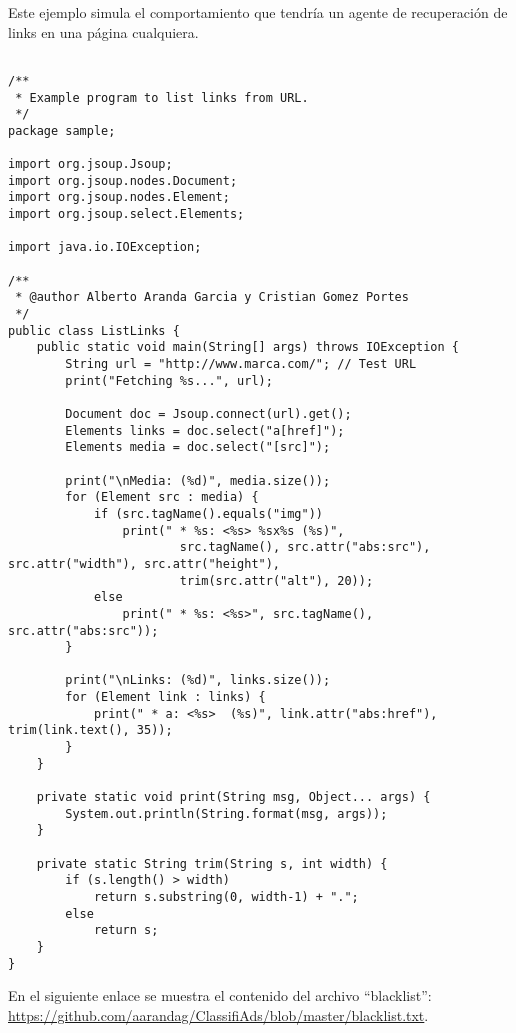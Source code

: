 \documentclass{pre-tfg}
\begin{document}
Este ejemplo simula el comportamiento que tendría un agente de recuperación de links en una página cualquiera.

\begin{lstlisting}[caption=Ejemplo de código de recuperación de links de una URL,style=java]

/**
 * Example program to list links from URL. 
 */
package sample;

import org.jsoup.Jsoup;
import org.jsoup.nodes.Document;
import org.jsoup.nodes.Element;
import org.jsoup.select.Elements;

import java.io.IOException;

/**
 * @author Alberto Aranda Garcia y Cristian Gomez Portes
 */
public class ListLinks {
    public static void main(String[] args) throws IOException {
        String url = "http://www.marca.com/"; // Test URL
        print("Fetching %s...", url);

        Document doc = Jsoup.connect(url).get();
        Elements links = doc.select("a[href]");
        Elements media = doc.select("[src]");

        print("\nMedia: (%d)", media.size());
        for (Element src : media) {
            if (src.tagName().equals("img"))
                print(" * %s: <%s> %sx%s (%s)",
                        src.tagName(), src.attr("abs:src"), src.attr("width"), src.attr("height"),
                        trim(src.attr("alt"), 20));
            else
                print(" * %s: <%s>", src.tagName(), src.attr("abs:src"));
        }

        print("\nLinks: (%d)", links.size());
        for (Element link : links) {
            print(" * a: <%s>  (%s)", link.attr("abs:href"), trim(link.text(), 35));
        }
    }

    private static void print(String msg, Object... args) {
        System.out.println(String.format(msg, args));
    }

    private static String trim(String s, int width) {
        if (s.length() > width)
            return s.substring(0, width-1) + ".";
        else
            return s;
    }
}

\end{lstlisting}

En el siguiente enlace se muestra el contenido del archivo ``blacklist'': \url{https://github.com/aarandag/ClassifiAds/blob/master/blacklist.txt}.

\clearpage


\singlespacing

\end{document}
